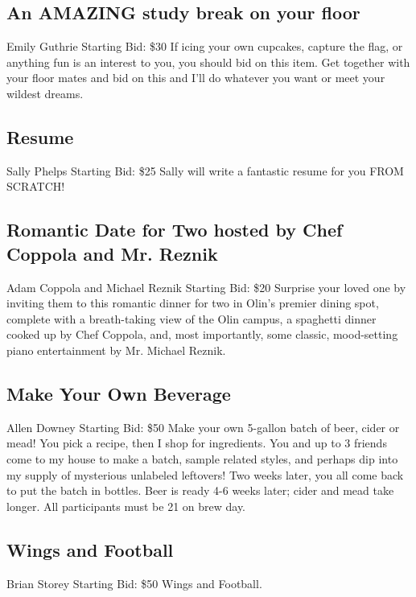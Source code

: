 \documentclass[11pt]{article}
\begin{document}
\subsection{An AMAZING study break on your floor}
Emily Guthrie
\newline
Starting Bid: \$30
\newline
If icing your own cupcakes, capture the flag, or anything fun is an interest to you, you should bid on this item. Get together with your floor mates and bid on this and I'll do whatever you want or meet your wildest dreams.
\subsection{Resume}
Sally Phelps
\newline
Starting Bid: \$25
\newline
Sally will write a fantastic resume for you FROM SCRATCH!
\subsection{Romantic Date for Two hosted by Chef Coppola and Mr. Reznik}
Adam Coppola and Michael Reznik
\newline
Starting Bid: \$20
\newline
Surprise your loved one by inviting them to this romantic dinner for two in Olin's premier dining spot, complete with a breath-taking view of the Olin campus, a spaghetti dinner cooked up by Chef Coppola, and, most importantly, some classic, mood-setting piano entertainment by Mr. Michael Reznik.
\subsection{Make Your Own Beverage}
Allen Downey
\newline
Starting Bid: \$50
\newline
Make your own 5-gallon batch of beer, cider or mead! You pick a recipe, then I shop for ingredients.  You and up to 3 friends come to my house to make a batch, sample related styles, and perhaps dip into my supply of mysterious unlabeled leftovers! Two weeks later, you all come back to put the batch in bottles. Beer is ready 4-6 weeks later; cider and mead take longer.  All participants must be 21 on brew day.
\subsection{Wings and Football}
Brian Storey
\newline
Starting Bid: \$50
\newline
Wings and Football.  
\end{document}
